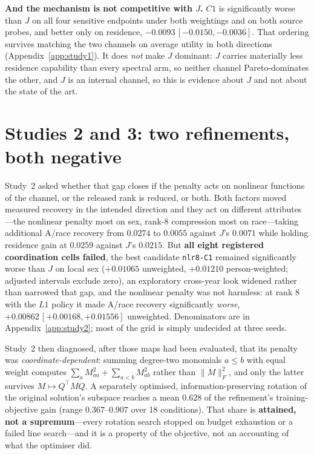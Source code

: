 \documentclass[10pt]{article}
\begin{document}
\textbf{And the mechanism is not competitive with $J$.} $C1$ is significantly worse than $J$ on all
four sensitive endpoints under both weightings and on both source probes, and better only on
residence, $-0.0093\,[-0.0150,-0.0036]$. That ordering survives matching the two channels on average
utility in both directions (Appendix~\ref{app:study1}). It does \emph{not} make $J$ dominant: $J$
carries materially less residence capability than every spectral arm, so neither channel
Pareto-dominates the other, and $J$ is an internal channel, so this is evidence about $J$ and not
about the state of the art.

\section{Studies 2 and 3: two refinements, both negative}
\label{sec:study23}

Study~2 asked whether that gap closes if the penalty acts on nonlinear functions of the channel, or
the released rank is reduced, or both. Both factors moved measured recovery in the intended direction
and they act on different attributes---the nonlinear penalty most on sex, rank-8 compression most on
race---taking additional A/race recovery from $0.0274$ to $0.0055$ against $J$'s $0.0071$ while
holding residence gain at $0.0259$ against $J$'s $0.0215$. But \textbf{all eight registered
coordination cells failed}, the best candidate \texttt{nlr8-C1} remained significantly worse than $J$
on local sex ($+0.01065$ unweighted, $+0.01210$ person-weighted; adjusted intervals exclude zero), an
exploratory cross-year look widened rather than narrowed that gap, and the nonlinear penalty was not
harmless: at rank 8 with the $L1$ policy it made A/race recovery significantly \emph{worse},
$+0.00862\,[+0.00168,+0.01556]$ unweighted. Denominators are in Appendix~\ref{app:study2}; most of
the grid is simply undecided at three seeds.

Study~2 then diagnosed, after those maps had been evaluated, that its penalty was
\emph{coordinate-dependent}: summing degree-two monomials $a\le b$ with equal weight computes
$\sum_a M_{aa}^2+\sum_{a<b}M_{ab}^2$ rather than $\|M\|_F^2$, and only the latter survives
$M\mapsto Q^\top MQ$. A separately optimised, information-preserving rotation of the original
solution's subspace reaches a mean $0.628$ of the refinement's training-objective gain (range
$0.367$--$0.907$ over 18 conditions). That share is \textbf{attained, not a supremum}---every rotation
search stopped on budget exhaustion or a failed line search---and it is a property of the objective,
not an accounting of what the optimiser did.
\end{document}
